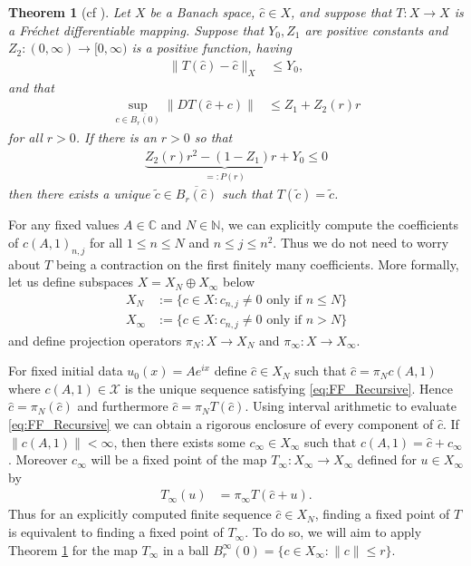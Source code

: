 \documentclass{article}
\newtheorem{theorem}{Theorem}[section]
\newcommand{\C}{\mathbb{C}}
\newcommand{\N}{\mathbb{N}}
\newcommand{\cTrunc}{\hat{c}}
\newcommand{\cX}{\mathcal{X}}
\begin{document}
  
  \begin{theorem}[cf \cite{james2017validated}] %
  	\label{prop:RadiiPolynomial}
  	Let $X$ be a Banach space, $ \hat{c} \in X$, and suppose  that $T: X \to X$ is a Fr\'echet differentiable mapping.
  	Suppose that $ Y_0, Z_1$ are positive constants and   $ Z_2: (0,\infty) \to [0, \infty)$ is a positive function, having   
  	\begin{align}\label{eq:Y0_thm}
  	\|T(\hat{c}) - \hat{c} \|_X &\leq Y_0 ,
  	\end{align}
  	and that 
  	\begin{align}\label{eq:Zbound_thm}
  	\sup_{c \in \overline{B_r( 0)}} \| DT( \hat{c}+c)\|  &\leq Z_1 +  Z_2(r) r 
  	\end{align}
  	for all $ r > 0$. 
  	If there is an $r>0$ so that 
  	\begin{align}\label{eq:RadiiPolynomial}
  	\underbrace{Z_2(r)r^2-(1-Z_1)r + Y_0}_{=:P(r)} \leq 0  
  	\end{align}
  	then there exists a unique $ \tilde{c} \in \overline{B_r(\hat{c})}$ such  that $ T(\tilde{c}) = \tilde{c}$. 
  \end{theorem}
  
 
  
  For any fixed values $A \in \C$ and  $ N \in \N$,  we can explicitly compute the coefficients of $ c(A,1)_{n,j}$  for all $ 1 \leq n \leq N$ and $ n \leq j \leq n^2$. 
  Thus we do not need to worry about $T$ being a contraction on the first finitely many coefficients. 
  More formally, let us define subspaces $ X = X_N \oplus X_\infty$ below
\begin{align*}
	X_N &:= \{
	c \in X : c_{n,j} \neq  0 \mbox{ only if } n \leq N
	\} \\
	X_\infty &:= \{
	c \in X : c_{n,j} \neq 0 \mbox{ only if } n >  N
	\} 
\end{align*}  
and define  projection operators $ \pi_N: X \to X_N $ and $ \pi_\infty : X \to X_\infty$.


For fixed initial data $ u_0(x) = Ae^{i x}$  define $ \hat{c} \in X_N$ such that $ \hat{c} = \pi_N c(A,1)$ where $ c(A,1) \in \cX$ is the unique sequence satisfying \eqref{eq:FF_Recursive}. 
Hence $ \hat{c} = \pi_N ( \hat{c})$ and furthermore $ \hat{c} = \pi_N  T(\hat{c})$. 
Using interval arithmetic to evaluate \eqref{eq:FF_Recursive} we can obtain a rigorous enclosure of  every component of $\hat{c}$. 
If $ \| c(A,1)\| < \infty$, then there exists some $ c_\infty \in X_ \infty$ such that $ c(A,1)  = \hat{c}+ c_\infty$. 
Moreover $c_\infty$  will be a fixed point of the map 
$
T_{\infty} : X_\infty \to X_\infty 
$  
defined for $u \in X_\infty$ by 
\begin{align}\label{eq:TinftyDef}
	T_\infty (u) &= \pi_\infty T(\cTrunc +u) .
\end{align}
Thus for an explicitly computed finite sequence $ \hat{c} \in X_N$, finding a fixed point of $T$ is equivalent to finding a fixed point of $ T_\infty$. To do so, we will aim to apply Theorem \ref{prop:RadiiPolynomial} for the map $T_\infty$ in a ball $ B_{r}^{\infty}(0) = \{ c \in X_{\infty} : \| c \| \leq r \}$.  
\end{document}
